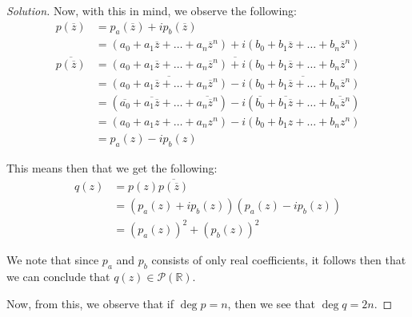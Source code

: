 \documentclass{article}
\newenvironment{solution}{\begin{proof}[Solution]}{\end{proof}}
\newcommand{\RR}{\mathbb{R}}
\begin{document}
\begin{solution}
		Now, with this in mind, we observe the following:
		\begin{align*}
			p(\overline{z}) &= p_{a}(\overline{z}) + ip_{b}(\overline{z}) \\
			&= (a_{0} + a_{1}\overline{z} + \ldots + a_{n}\overline{z}^{n}) + i(b_{0} + b_{1}\overline{z} + \ldots + b_{n}\overline{z}^{n}) \\
			\overline{p(\overline{z})} &= \overline{(a_{0} + a_{1}\overline{z} + \ldots + a_{n}\overline{z}^{n}) + i(b_{0} + b_{1}\overline{z} + \ldots + b_{n}\overline{z}^{n})} \\
			&= \overline{(a_{0} + a_{1}\overline{z} + \ldots + a_{n}\overline{z}^{n})} -i\overline{(b_{0} + b_{1}\overline{z} + \ldots + b_{n}\overline{z}^{n})} \\
			&= (\overline{a_{0}} + \overline{a_{1}\overline{z}} + \ldots + \overline{a_{n} \overline{z}^{n}}) - i(\overline{b_{0}} + \overline{b_{1}\overline{z}} + \ldots + \overline{b_{n} \overline{z}^{n}}) \\
			&= (a_{0} + a_{1}z + \ldots + a_{n}z^{n}) - i(b_{0} + b_{1}z + \ldots + b_{n}z^{n}) \\
			&= p_{a}(z) - ip_{b}(z)
		\end{align*}
		
		This means then that we get the following:
		\begin{align*}
			q(z) &= p(z) \overline{p(\overline{z})} \\
			&= (p_{a}(z) + ip_{b}(z))(p_{a}(z) - ip_{b}(z)) \\
			&= (p_{a}(z))^{2} + (p_{b}(z))^{2}
		\end{align*}
	
		We note that since $p_{a}$ and $p_{b}$ consists of only real coefficients, it follows then that we can conclude that $q(z) \in \mathscr{P}(\RR)$.
		
		Now, from this, we observe that if $\deg p = n$, then we see that $\deg q = 2n$.
	\end{solution}

	\newpage
	
\end{document}
